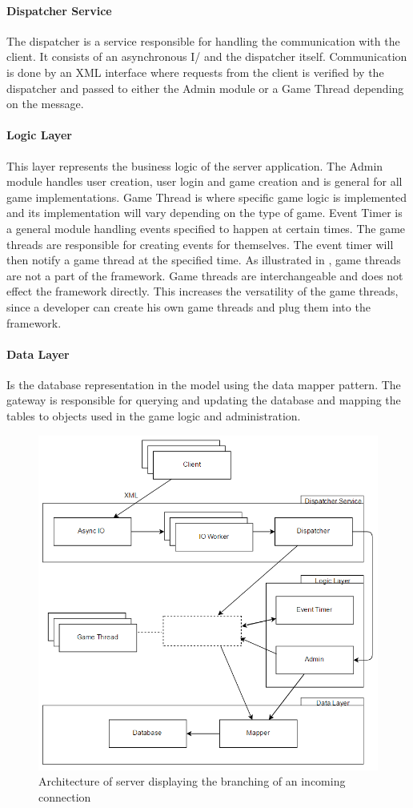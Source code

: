 \paragraph{Dispatcher Service}
The dispatcher is a service responsible for handling the communication with the client. It consists of an asynchronous I/ and the dispatcher itself. Communication is done by an XML interface where requests from the client is verified by the dispatcher and passed to either the Admin module or a Game Thread depending on the message. 

\paragraph{Logic Layer}
This layer represents the business logic of the server application. The Admin module handles user creation, user login and game creation and is general for all game implementations. Game Thread is where specific game logic is implemented and its implementation will vary depending on the type of game. Event Timer is a general module handling events specified to happen at certain times. The game threads are responsible for creating events for themselves. The event timer will then notify a game thread at the specified time. As illustrated in , game threads are not a part of the framework. Game threads are interchangeable and does not effect the framework directly. This increases the versatility of the game threads, since a developer can create his own game threads and plug them into the framework.

\paragraph{Data Layer}
Is the database representation in the model using the data mapper pattern. The gateway is responsible for querying and updating the database and mapping the tables to objects used in the game logic and administration.

\begin{figure}[H]
  \centering
  \includegraphics[width=\textwidth]{billeder/serverarch.png}  
  \caption{Architecture of server displaying the branching of an incoming connection}
  \label{fig:serverarch}
\end{figure}
